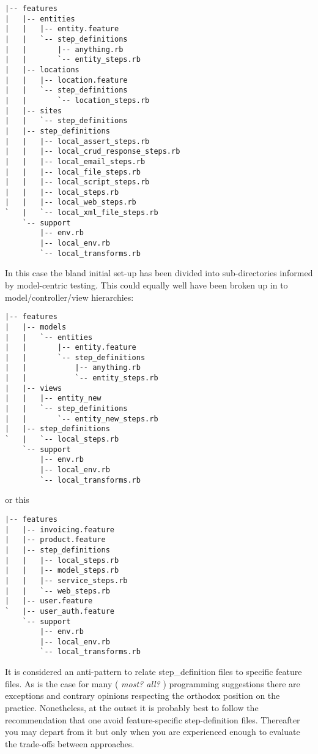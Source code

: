 \documentclass[10pt]{book}
\begin{document}
\begin{verbatim}
|-- features
|   |-- entities
|   |   |-- entity.feature
|   |   `-- step_definitions
|   |       |-- anything.rb
|   |       `-- entity_steps.rb
|   |-- locations
|   |   |-- location.feature
|   |   `-- step_definitions
|   |       `-- location_steps.rb
|   |-- sites
|   |   `-- step_definitions
|   |-- step_definitions
|   |   |-- local_assert_steps.rb
|   |   |-- local_crud_response_steps.rb
|   |   |-- local_email_steps.rb
|   |   |-- local_file_steps.rb
|   |   |-- local_script_steps.rb
|   |   |-- local_steps.rb
|   |   |-- local_web_steps.rb
`   |   `-- local_xml_file_steps.rb   
    `-- support
        |-- env.rb
        |-- local_env.rb
        `-- local_transforms.rb

\end{verbatim}
In this case the bland initial set-up has been divided into sub-directories informed by model-centric testing.  This could equally well have been broken up in to model/controller/view hierarchies:

\begin{verbatim}
|-- features
|   |-- models
|   |   `-- entities
|   |       |-- entity.feature
|   |       `-- step_definitions
|   |           |-- anything.rb
|   |           `-- entity_steps.rb
|   |-- views
|   |   |-- entity_new
|   |   `-- step_definitions
|   |       `-- entity_new_steps.rb
|   |-- step_definitions
`   |   `-- local_steps.rb
    `-- support
        |-- env.rb
        |-- local_env.rb
        `-- local_transforms.rb

\end{verbatim}
or this
\begin{verbatim}
|-- features
|   |-- invoicing.feature
|   |-- product.feature
|   |-- step_definitions
|   |   |-- local_steps.rb
|   |   |-- model_steps.rb
|   |   |-- service_steps.rb
|   |   `-- web_steps.rb
|   |-- user.feature
`   |-- user_auth.feature
    `-- support
        |-- env.rb
        |-- local_env.rb
        `-- local_transforms.rb

\end{verbatim}
It is considered an anti-pattern to relate step\_definition files to specific feature files.  As is the case for many ( \emph{most? all?} ) programming suggestions there are exceptions and contrary opinions respecting the orthodox position on the practice.  Nonetheless,  at the outset it is probably best to follow the recommendation that one avoid feature-specific step-definition files.  Thereafter you may depart from it but only when you are experienced enough to evaluate the trade-offs between approaches.
\end{document}
